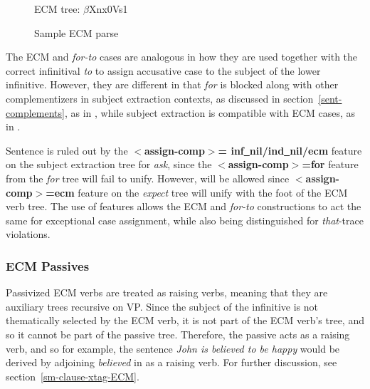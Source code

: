 \begin{figure}[hbt]
\centering
\hspace{0.0in}
\caption{ECM tree: $\beta$Xnx0Vs1}
\label{expects-decl}
\label{3;1,15}
\end{figure}

\begin{figure}[hbt]
\centering
\hspace{0.0in}
\caption{Sample ECM parse}
\label{van-expects}
\end{figure}

The ECM and {\it for-to\/} cases are analogous in how they are used together
with the correct infinitival {\it to} to assign accusative case to the 
subject of the lower infinitive.  However, they are different in that
{\it for} is blocked along with other complementizers in subject extraction
contexts, as discussed in section~\ref{sent-complements}, as in
, while subject extraction is compatible with ECM cases, 
as in .


Sentence  is ruled out by the {\bf $<$assign-comp$>$=
inf\underline{~}nil/ind\underline{~}nil/ecm} feature
on the subject extraction tree for {\it ask}, since the
{\bf $<$assign-comp$>$=for} feature from the {\it for} tree will fail to 
unify.  However, 
 will be allowed since {\bf $<$assign-comp$>$=ecm} feature on the
{\it expect} tree will unify with the foot of the ECM verb tree.  
The use of features allows the ECM and
{\it for-to\/} constructions to act the same for exceptional case assignment,
while also being distinguished for {\it that}-trace violations.


\subsubsection{ECM Passives}

Passivized ECM verbs are treated as raising verbs, meaning that they are
auxiliary trees recursive on VP.
Since the
subject of the infinitive is not thematically selected by the ECM verb,
it is not part of the ECM verb's tree, and so it cannot be part of the
passive tree. Therefore, the passive acts as a raising verb, and so for
example, 
the sentence {\it John is believed to be happy} would be derived by
adjoining {\it believed} in as a raising verb.  For
further discussion, see section~\ref{sm-clause-xtag-ECM}.


